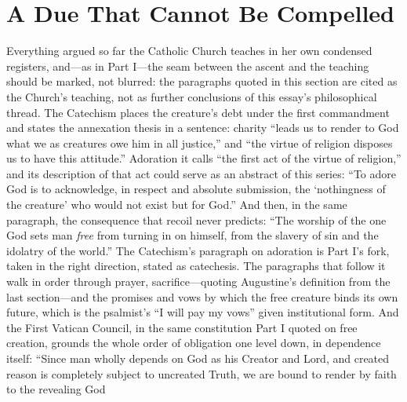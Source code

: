 \section{A Due That Cannot Be Compelled}

Everything argued so far the Catholic Church teaches in her own condensed registers, and---as in Part I---the seam between the ascent and the teaching should be marked, not blurred: the paragraphs quoted in this section are cited as the Church's teaching, not as further conclusions of this essay's philosophical thread. The Catechism places the creature's debt under the first commandment and states the annexation thesis in a sentence: charity ``leads us to render to God what we as creatures owe him in all justice,'' and ``the virtue of religion disposes us to have this attitude.'' Adoration it calls ``the first act of the virtue of religion,'' and its description of that act could serve as an abstract of this series: ``To adore God is to acknowledge, in respect and absolute submission, the `nothingness of the creature' who would not exist but for God.'' And then, in the same paragraph, the consequence that recoil never predicts: ``The worship of the one God sets man \emph{free} from turning in on himself, from the slavery of sin and the idolatry of the world.'' The Catechism's paragraph on adoration is Part I's fork, taken in the right direction, stated as catechesis. The paragraphs that follow it walk in order through prayer, sacrifice---quoting Augustine's definition from the last section---and the promises and vows by which the free creature binds its own future, which is the psalmist's ``I will pay my vows'' given institutional form. And the First Vatican Council, in the same constitution Part I quoted on free creation, grounds the whole order of obligation one level down, in dependence itself: ``Since man wholly depends on God as his Creator and Lord, and created reason is completely subject to uncreated Truth, we are bound to render by faith to the revealing God 